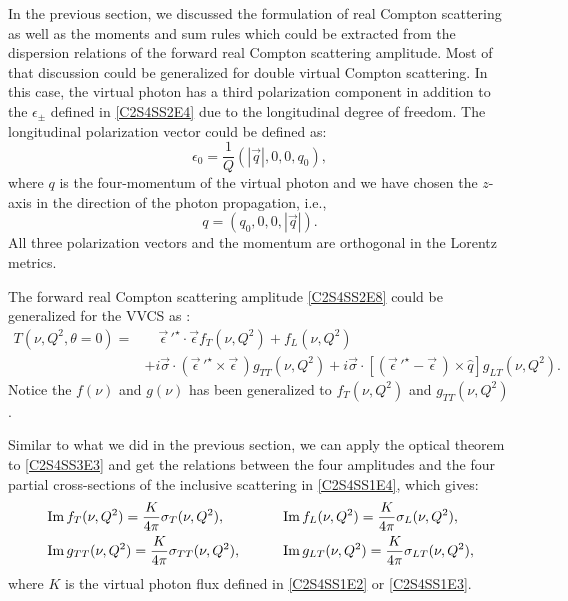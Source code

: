 In the previous section, we discussed the formulation of real Compton scattering as well as the moments and sum rules which could be extracted from the dispersion relations of the forward real Compton scattering amplitude. Most of that discussion could be generalized for double virtual Compton scattering. In this case, the virtual photon has a third polarization component in addition to the $\epsilon_\pm$ defined in \cref{C2S4SS2E4} due to the longitudinal degree of freedom. The longitudinal polarization vector could be defined as:
\begin{equation} \label{C2S4SS3E1}
\epsilon_0 = \frac{1}{Q}(|\vec{q}|,0,0,q_0),
\end{equation}
where $q$ is the four-momentum of the virtual photon and we have chosen the $z$-axis in the direction of the photon propagation, i.e.,
\begin{equation} \label{C2S4SS3E2}
q = (q_0,0,0,|\vec{q}|).
\end{equation}
All three polarization vectors and the momentum are orthogonal in the Lorentz metrics.

The forward real Compton scattering amplitude \cref{C2S4SS2E8} could be generalized for the VVCS as \cite{Drechsel2003}:
\begin{equation} \label{C2S4SS3E3}
\begin{split}
T(\nu,Q^2,\theta=0) = & \quad \vec{\epsilon}\,'^\star\cdot\vec{\epsilon}f_T(\nu,Q^2)+f_L(\nu,Q^2) \\
& +i\vec{\sigma}\cdot(\vec{\epsilon}\,'^\star\times\vec{\epsilon}\,)g_{TT}(\nu,Q^2)+i\vec{\sigma}\cdot[(\vec{\epsilon}\,'^\star-\vec{\epsilon}\,)\times\hat{q}]g_{LT}(\nu,Q^2).
\end{split}
\end{equation}
Notice the $f(\nu)$ and $g(\nu)$ has been generalized to $f_T(\nu,Q^2)$ and $g_{TT}(\nu,Q^2)$.

Similar to what we did in the previous section, we can apply the optical theorem to \cref{C2S4SS3E3} and get the relations between the four amplitudes and the four partial cross-sections of the inclusive scattering in \cref{C2S4SS1E4}, which gives:
\begin{equation} \label{C2S4SS3E4}
\begin{aligned}
& \Im f_T(\nu,Q^2) = \frac{K}{4\pi}\sigma_T(\nu,Q^2), & \qquad & \Im f_L(\nu,Q^2) = \frac{K}{4\pi}\sigma_L(\nu,Q^2), \\
& \Im g_{TT}(\nu,Q^2) = \frac{K}{4\pi}\sigma_{TT}(\nu,Q^2), & \qquad & \Im g_{LT}(\nu,Q^2) = \frac{K}{4\pi}\sigma_{LT}(\nu,Q^2),
\end{aligned}
\end{equation}
where $K$ is the virtual photon flux defined in \cref{C2S4SS1E2} or \cref{C2S4SS1E3}.

